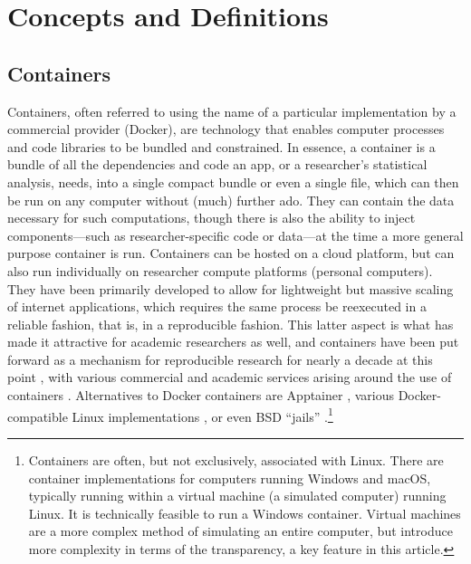\documentclass[inline]{hdsr}
\begin{document}
\section{Concepts and Definitions}

\subsection{Containers}

Containers, often referred to using the name of a particular implementation by a commercial provider (Docker), are technology that enables computer processes and code libraries to be bundled and constrained. In essence, a container is a bundle of all the dependencies and code an app, or a researcher's statistical analysis, needs, into a single compact bundle or even a single file, which can then be run on any computer without (much) further ado. They can  contain the data necessary for such computations, though there is also the ability to inject components---such as researcher-specific code or data---at the time a more general purpose container is run. Containers can be hosted on a cloud platform, but can also run individually on researcher compute platforms (personal computers). They have been primarily developed to allow for lightweight but massive scaling of internet applications, which requires the same process be reexecuted in a reliable fashion, that is, in a reproducible fashion. This latter aspect is what has made it attractive for academic researchers as well, and containers have been put forward as a mechanism for reproducible research for nearly a decade at this point \citep{boettiger_introduction_2015}, with various commercial and academic services arising around the use of containers \citep{clyburne-sherin_computational_2019,chard_toward_2020,brinckman_computing_2018}. Alternatives to Docker containers are Apptainer \citep{contributors_to_the_apptainer_project_apptainer_2025}, various Docker-compatible Linux implementations \citep[for instance, ][]{noauthor_podman_nodate}, or even BSD ``jails'' \citep{the_freebsd_project_chapter_2025}.\footnote{Containers are often, but not exclusively, associated with Linux.  There are container implementations for computers running Windows and macOS, typically running within a virtual machine (a simulated computer) running Linux. It is technically feasible to run a Windows container. Virtual machines are a more complex method of simulating an entire computer, but introduce more complexity in terms of the transparency, a key feature in this article.} 
\end{document}
